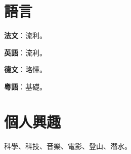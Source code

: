 \documentclass[a4paper,extended,zh-hant]{adcv}
\begin{document}
    \section{語言}

    \ifextended
        \begin{adcvlanguages}
            \adcvlanguagesheader
            \adcvlanguagesfooter
        \end{adcvlanguages}
    \else
        \textbf{法文}：流利。

        \textbf{英語}：流利。

        \textbf{德文}：略懂。

        \textbf{粵語}：基礎。
    \fi

    \section{個人興趣}

    科學、科技、音樂、電影、登山、潛水。
\end{document}
